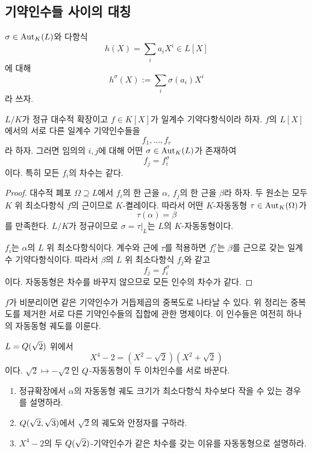 \subsection{기약인수들 사이의 대칭}

$\sigma\in\operatorname{Aut}_K(L)$와 다항식
\[
  h(X)=\sum_i a_iX^i\in L[X]
\]
에 대해
\[
  h^\sigma(X):=\sum_i\sigma(a_i)X^i
\]
라 쓰자.

\begin{theorem}
$L/K$가 정규 대수적 확장이고 $f\in K[X]$가 일계수 기약다항식이라 하자. $f$의 $L[X]$에서의 서로 다른 일계수 기약인수들을
\[
  f_1,\dots,f_r
\]
라 하자. 그러면 임의의 $i,j$에 대해 어떤 $\sigma\in\operatorname{Aut}_K(L)$가 존재하여
\[
  f_j=f_i^\sigma
\]
이다. 특히 모든 $f_i$의 차수는 같다.
\end{theorem}

\begin{proof}
대수적 폐포 $\Omega\supseteq L$에서 $f_i$의 한 근을 $\alpha$, $f_j$의 한 근을 $\beta$라 하자. 두 원소는 모두 $K$ 위 최소다항식 $f$의 근이므로 $K$-켤레이다. 따라서 어떤 $K$-자동동형 $\tau\in\operatorname{Aut}_K(\Omega)$가
\[
  \tau(\alpha)=\beta
\]
를 만족한다. $L/K$가 정규이므로 $\sigma=\tau|_L$는 $L$의 $K$-자동동형이다.

$f_i$는 $\alpha$의 $L$ 위 최소다항식이다. 계수와 근에 $\tau$를 적용하면 $f_i^\sigma$는 $\beta$를 근으로 갖는 일계수 기약다항식이다. 따라서 $\beta$의 $L$ 위 최소다항식 $f_j$와 같고
\[
  f_j=f_i^\sigma
\]
이다. 자동동형은 차수를 바꾸지 않으므로 모든 인수의 차수가 같다.
\end{proof}

\begin{remark}
$f$가 비분리이면 같은 기약인수가 거듭제곱의 중복도로 나타날 수 있다. 위 정리는 중복도를 제거한 서로 다른 기약인수들의 집합에 관한 명제이다. 이 인수들은 여전히 하나의 자동동형 궤도를 이룬다.
\end{remark}

\begin{example}
$L=Q(\sqrt2)$ 위에서
\[
  X^4-2=(X^2-\sqrt2)(X^2+\sqrt2)
\]
이다. $\sqrt2\mapsto-\sqrt2$인 $Q$-자동동형이 두 이차인수를 서로 바꾼다.
\end{example}

\begin{checkpoint}
\begin{enumerate}[label=(\alph*)]
  \item 정규확장에서 $\alpha$의 자동동형 궤도 크기가 최소다항식 차수보다 작을 수 있는 경우를 설명하라.
  \item $Q(\sqrt2,\sqrt3)$에서 $\sqrt2$의 궤도와 안정자를 구하라.
  \item $X^4-2$의 두 $Q(\sqrt2)$-기약인수가 같은 차수를 갖는 이유를 자동동형으로 설명하라.
\end{enumerate}
\end{checkpoint}
